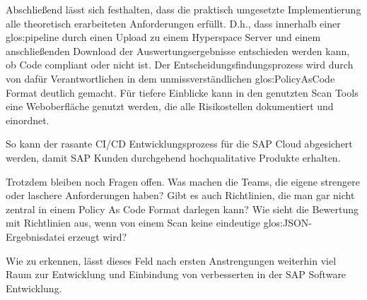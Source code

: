 \documentclass[../main.tex]{subfiles}
\begin{document}
Abschließend lässt sich festhalten, dass die praktisch umgesetzte Implementierung alle theoretisch erarbeiteten Anforderungen erfüllt.
D.h., dass innerhalb einer \gls{glos:pipeline} durch einen Upload zu einem Hyperspace Server und einem anschließenden Download der Auswertungsergebnisse entschieden werden kann, ob Code compliant oder nicht ist.
Der Entscheidungsfindungsprozess wird durch von dafür Verantwortlichen in dem unmissverständlichen \gls{glos:PolicyAsCode} Format deutlich gemacht.
Für tiefere Einblicke kann in den genutzten Scan Tools eine Weboberfläche genutzt werden, die alle Risikostellen dokumentiert und einordnet.

So kann der rasante \gls{CI/CD} Entwicklungsprozess für die SAP Cloud abgesichert werden, damit SAP Kunden durchgehend hochqualitative Produkte erhalten.

Trotzdem bleiben noch Fragen offen.
Was machen die Teams, die eigene strengere oder laschere Anforderungen haben?
Gibt es auch Richtlinien, die man gar nicht zentral in einem Policy As Code Format darlegen kann?
Wie sieht die Bewertung mit Richtlinien aus, wenn von einem Scan keine eindeutige \gls{glos:JSON}-Ergebnisdatei erzeugt wird?

Wie zu erkennen, lässt dieses Feld nach ersten Anstrengungen weiterhin viel Raum zur Entwicklung und Einbindung von verbesserten  in der SAP Software Entwicklung.
\end{document}
